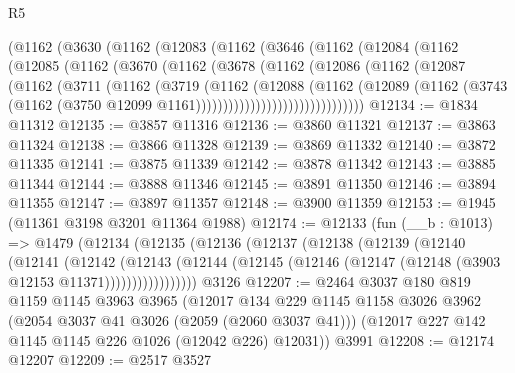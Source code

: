 \begin{lexlean}{R5}
\begin{coremodule}
      (@1162
        (@3630
          (@1162
            (@12083
              (@1162
                (@3646
                  (@1162
                    (@12084
                      (@1162
                        (@12085
                          (@1162
                            (@3670
                              (@1162
                                (@3678
                                  (@1162
                                    (@12086
                                      (@1162
                                        (@12087
                                          (@1162
                                            (@3711
                                              (@1162
                                                (@3719
                                                  (@1162
                                                    (@12088
                                                      (@1162
                                                        (@12089
                                                          (@1162
                                                            (@3743
                                                              (@1162
                                                                (@3750
                                                                  @12099
                                                                  @1161)))))))))))))))))))))))))))))))
@12134 := @1834 @11312
@12135 := @3857 @11316
@12136 := @3860 @11321
@12137 := @3863 @11324
@12138 := @3866 @11328
@12139 := @3869 @11332
@12140 := @3872 @11335
@12141 := @3875 @11339
@12142 := @3878 @11342
@12143 := @3885 @11344
@12144 := @3888 @11346
@12145 := @3891 @11350
@12146 := @3894 @11355
@12147 := @3897 @11357
@12148 := @3900 @11359
@12153 := @1945 (@11361 @3198 @3201 @11364 @1988)
@12174 := @12133
    (fun (__b : @1013) =>
    @1479
      (@12134
        (@12135
          (@12136
            (@12137
              (@12138
                (@12139
                  (@12140
                    (@12141
                      (@12142
                        (@12143
                          (@12144
                            (@12145 (@12146 (@12147 (@12148 (@3903 @12153 @11371)))))))))))))))))
    @3126
@12207 := @2464
    @3037
    @180
    @819
    @1159
    @1145
    @3963
    @3965
    (@12017
      @134
      @229
      @1145
      @1158
      @3026
      @3962
      (@2054 @3037 @41 @3026 (@2059 (@2060 @3037 @41)))
      (@12017 @227 @142 @1145 @1145 @226 @1026 (@12042 @226) @12031))
    @3991
@12208 := @12174 @12207
@12209 := @2517 @3527

\end{coremodule}
\end{lexlean}
